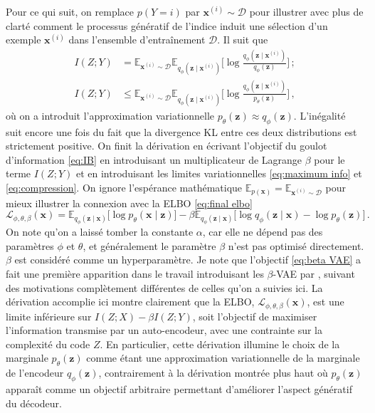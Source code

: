 Pour ce qui suit, on remplace $p(Y=i)$ par $\mathbf{x}^{(i)} \sim \mathcal{D}$ pour illustrer avec plus de clarté 
comment le processus génératif de l'indice induit une sélection d'un exemple $\mathbf{x}^{(i)}$ dans l'ensemble 
d'entraînement $\mathcal{D}$. Il suit que 
\begin{align}
        I(Z; Y) &= \mathbb{E}_{\mathbf{x}^{(i)} \sim \mathcal{D}} \mathbb{E}_{q_\phi(\mathbf{z} \mid \mathbf{x}^{(i)})} \bigg[ 
                \log \frac{q_\phi(\mathbf{z} \mid \mathbf{x}^{(i)}) }{q_\phi (\mathbf{z})}        
        \bigg]\, ; \\[1.5ex]
        \label{eq:compression}
        I(Z; Y) &\leq \mathbb{E}_{\mathbf{x}^{(i)} \sim \mathcal{D}} \mathbb{E}_{q_\phi(\mathbf{z} \mid \mathbf{x}^{(i)})} \bigg[ 
                \log \frac{q_\phi(\mathbf{z} \mid \mathbf{x}^{(i)}) }{p_\theta (\mathbf{z})}        
        \bigg]\, , 
\end{align}
où on a introduit l'approximation variationnelle $p_\theta(\mathbf{z}) \approx q_\phi(\mathbf{z})$. 
L'inégalité suit encore une fois 
du fait que la divergence KL entre ces deux distributions est strictement positive.
On finit la dérivation en écrivant l'objectif du goulot d'information \eqref{eq:IB} en introduisant un multiplicateur 
de Lagrange $\beta$ pour le terme $I(Z; Y)$ et en introduisant 
les limites variationnelles \eqref{eq:maximum info} et \eqref{eq:compression}. On ignore  
l'espérance mathématique $\mathbb{E}_{p(\mathbf{x})} = \mathbb{E}_{\mathbf{x}^{(i)} \sim \mathcal{D}}$ pour mieux illustrer la connexion 
avec la ELBO \eqref{eq:final elbo}
\begin{equation}\label{eq:beta VAE}
        \mathcal{L}_{\phi,\theta,\beta}(\mathbf{x}) =  \mathbb{E}_{q_\phi(\mathbf{z} \mid \mathbf{x})} \bigg[\log p_\theta (\mathbf{x} \mid \mathbf{z})\bigg]
        -  \beta  \mathbb{E}_{q_\phi(\mathbf{z} \mid \mathbf{x})} \bigg[ 
                \log q_\phi(\mathbf{z} \mid \mathbf{x})        
                -\log p_\theta(\mathbf{z})
                \bigg]\, .
\end{equation} 
On note qu'on a laissé tomber la constante $\alpha$, car elle ne dépend pas des paramètres $\phi$ et $\theta$, et généralement le paramètre $\beta$ 
n'est pas optimisé directement. $\beta$ est considéré comme un hyperparamètre. 
Je note que l'objectif \eqref{eq:beta VAE} a fait une première apparition dans le travail introduisant les $\beta$-VAE par \citet{Higgins2017}, 
suivant des motivations complètement différentes de celles qu'on a suivies ici. La dérivation accomplie ici 
montre clairement que la ELBO, $\mathcal{L}_{\phi,\theta,\beta}(\mathbf{x})$, est une limite inférieure 
sur $I(Z; X) - \beta I(Z; Y)$, soit l'objectif de maximiser l'information transmise par un auto-encodeur, avec une 
contrainte sur la complexité du code $Z$. En particulier, cette dérivation illumine le choix de la marginale $p_\theta(\mathbf{z})$ 
comme étant une approximation variationnelle de la marginale de l'encodeur $q_\phi(\mathbf{z})$, contrairement à la dérivation 
montrée plus haut où $p_\theta(\mathbf{z})$ apparaît comme un objectif arbitraire permettant d'améliorer l'aspect 
génératif du décodeur.

